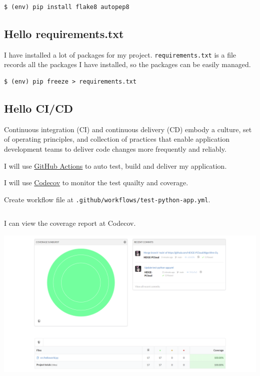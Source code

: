 \documentclass[a4paper]{report}
\begin{document}
\begin{verbatim}
$ (env) pip install flake8 autopep8
\end{verbatim}

\subsection{Hello requirements.txt}

I have installed a lot of packages for my project. \texttt{requirements.txt} is a file records all the packages I have installed, so the packages can be easily managed.

\begin{verbatim}
$ (env) pip freeze > requirements.txt
\end{verbatim}

\subsection{Hello CI/CD}

Continuous integration (CI) and continuous delivery (CD) embody a culture, set of operating principles, and collection of practices that enable application development teams to deliver code changes more frequently and reliably.

I will use \href{https://github.com/features/actions}{GitHub Actions} to auto test, build and deliver my application. 

I will use \href{https://codecov.io/}{Codecov} to monitor the test quailty and coverage.

Create workflow file at \texttt{.github/workflows/test-python-app.yml}.

\inputminted{yaml}{../.github/workflows/test-python-app.yml}

I can view the coverage report at Codecov.

\includegraphics[width=\linewidth]{Codecov.png}
\end{document}
